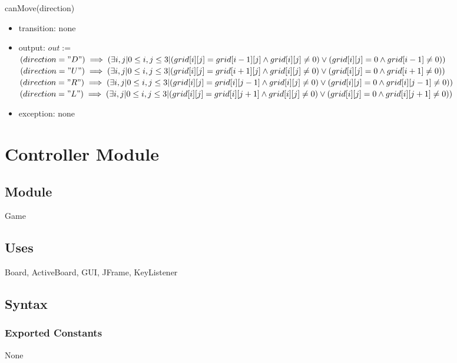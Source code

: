 \documentclass[12pt]{article}
\begin{document}
\noindent canMove(direction)
\begin{itemize}
    \item transition: none
    \item output: $out:= $\\
    $(direction = "D") \implies (\exists i,j| 0 \leq i,j \leq 3|(grid[i][j] = grid[i-1][j] \land grid[i][j] \neq 0) \lor (grid[i][j] = 0 \land grid[i-1] \neq 0))$ \\
    $(direction = "U") \implies (\exists i,j| 0 \leq i,j \leq 3|(grid[i][j] = grid[i+1][j] \land grid[i][j] \neq 0) \lor (grid[i][j] = 0 \land grid[i+1] \neq 0))$ \\
    $(direction = "R") \implies (\exists i,j| 0 \leq i,j \leq 3|(grid[i][j] = grid[i][j-1] \land grid[i][j] \neq 0) \lor (grid[i][j] = 0 \land grid[i][j-1] \neq 0))$ \\
    $(direction = "L") \implies (\exists i,j| 0 \leq i,j \leq 3|(grid[i][j] = grid[i][j+1] \land grid[i][j] \neq 0) \lor (grid[i][j] = 0 \land grid[i][j+1] \neq 0))$ 
    \item exception: none
\end{itemize}

\newpage

\section* {Controller Module}

\subsection*{Module}

Game

\subsection* {Uses}

Board, ActiveBoard, GUI, JFrame, KeyListener

\subsection* {Syntax}

\subsubsection* {Exported Constants}

None
\end{document}
